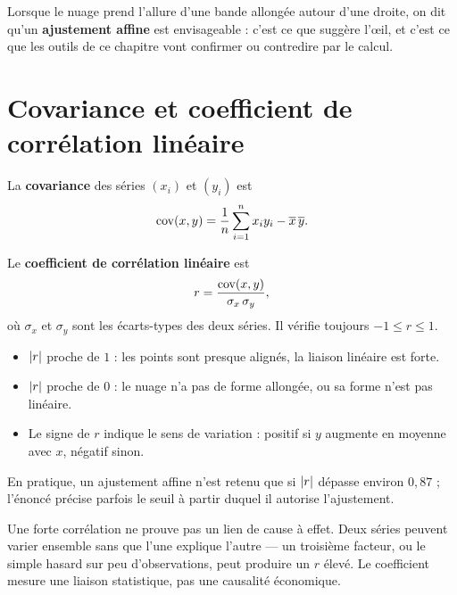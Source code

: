 \begin{remarque}
Lorsque le nuage prend l'allure d'une bande allongée autour d'une droite, on
dit qu'un \textbf{ajustement affine} est envisageable : c'est ce que
suggère l'œil, et c'est ce que les outils de ce chapitre vont confirmer ou
contredire par le calcul.
\end{remarque}

\section{Covariance et coefficient de corrélation linéaire}

\begin{definition}[covariance]
La \textbf{covariance} des séries $\left(x_{i}\right)$ et
$\left(y_{i}\right)$ est
\[
  \operatorname{cov}(x,y) = \frac{1}{n}\sum_{i=1}^{n}x_{i}y_{i}-\overline{x}\,\overline{y} .
\]
\end{definition}

\begin{definition}
Le \textbf{coefficient de corrélation linéaire} est
\[
  r = \frac{\operatorname{cov}(x,y)}{\sigma_{x}\,\sigma_{y}},
\]
où $\sigma_{x}$ et $\sigma_{y}$ sont les écarts-types des deux séries. Il
vérifie toujours $-1 \leq r \leq 1$.
\end{definition}

\begin{propriete}[lecture de $r$]
\begin{itemize}[leftmargin=*, itemsep=0.1em]
  \item $\left|r\right|$ proche de $1$ : les points sont presque alignés, la liaison
        linéaire est forte.
  \item $\left|r\right|$ proche de $0$ : le nuage n'a pas de forme allongée, ou sa
        forme n'est pas linéaire.
  \item Le signe de $r$ indique le sens de variation : positif si $y$
        augmente en moyenne avec $x$, négatif sinon.
\end{itemize}
En pratique, un ajustement affine n'est retenu que si $\left|r\right|$ dépasse
environ $0{,}87$ ; l'énoncé précise parfois le seuil à partir duquel il
autorise l'ajustement.
\end{propriete}

\begin{avertissement}
Une forte corrélation ne prouve pas un lien de cause à effet. Deux séries
peuvent varier ensemble sans que l'une explique l'autre — un troisième
facteur, ou le simple hasard sur peu d'observations, peut produire un $r$
élevé. Le coefficient mesure une liaison statistique, pas une causalité
économique.
\end{avertissement}

